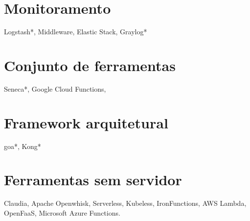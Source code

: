 


\section{Monitoramento}
Logstash*, Middleware, Elastic Stack, Graylog*

\section{Conjunto de ferramentas}
Seneca*, Google Cloud Functions,

\section{Framework arquitetural}
goa*, Kong*

\section{Ferramentas sem servidor}
Claudia, Apache Openwhisk, Serverless, Kubeless, IronFunctions, AWS Lambda, OpenFaaS, Microsoft Azure Functions.

